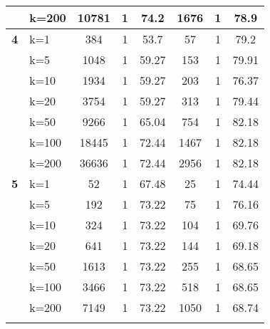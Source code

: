\begin{table}[htbp]
\begin{tabular}{|l|l|c|c|c|c|c|c|}
     & k=200 & 10781 & 1 & 74.2 & 1676 & 1 & 78.9 \\ \hline
    \multicolumn{1}{|r|}{\textbf{4}} & k=1 & 384 & 1 & 53.7 & 57 & 1 & 79.2 \\ 
     & k=5 & 1048 & 1 & 59.27 & 153 & 1 & 79.91 \\ 
     & k=10 & 1934 & 1 & 59.27 & 203 & 1 & 76.37 \\ 
     & k=20 & 3754 & 1 & 59.27 & 313 & 1 & 79.44 \\ 
     & k=50 & 9266 & 1 & 65.04 & 754 & 1 & 82.18 \\ 
     & k=100 & 18445 & 1 & 72.44 & 1467 & 1 & 82.18 \\ 
     & k=200 & 36636 & 1 & 72.44 & 2956 & 1 & 82.18 \\ \hline
    \multicolumn{1}{|r|}{\textbf{5}} & k=1 & 52 & 1 & 67.48 & 25 & 1 & 74.44 \\ 
     & k=5 & 192 & 1 & 73.22 & 75 & 1 & 76.16 \\ 
     & k=10 & 324 & 1 & 73.22 & 104 & 1 & 69.76 \\ 
     & k=20 & 641 & 1 & 73.22 & 144 & 1 & 69.18 \\ 
     & k=50 & 1613 & 1 & 73.22 & 255 & 1 & 68.65 \\ 
     & k=100 & 3466 & 1 & 73.22 & 518 & 1 & 68.65 \\ 
     & k=200 & 7149 & 1 & 73.22 & 1050 & 1 & 68.74 \\ \hline
     
    \label{results:usecase_}
    \end{tabular}
    \end{table}

